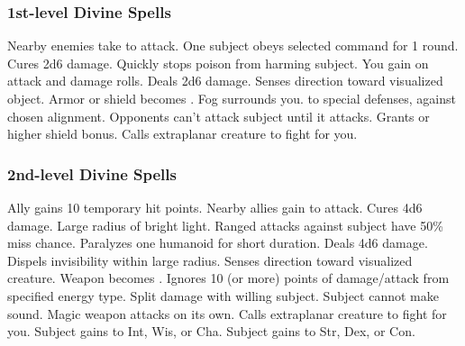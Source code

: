 \subsubsection{1st-level Divine Spells}
\begin{spelllist}
   Nearby enemies take  to attack.
   One subject obeys selected command for 1 round.
   Cures 2d6 damage.
   Quickly stops poison from harming subject.
   You gain  on attack and damage rolls.
   Deals 2d6 damage.
   Senses direction toward visualized object.
   Armor or shield becomes .
   Fog surrounds you.
    to special defenses,  against chosen alignment.
   Opponents can't attack subject until it attacks.
   Grants  or higher shield bonus.
   Calls extraplanar creature to fight for you.
\end{spelllist}

\subsubsection{2nd-level Divine Spells}
\begin{spelllist}
   Ally gains 10 temporary hit points.
   Nearby allies gain  to attack.
   Cures 4d6 damage.
   Large radius of bright light.
   Ranged attacks against subject have 50\% miss chance.
   Paralyzes one humanoid for short duration.
   Deals 4d6 damage.
   Dispels invisibility within large radius.
   Senses direction toward visualized creature.
   Weapon becomes .
   Ignores 10 (or more) points of damage/attack from specified energy type.
    Split damage with willing subject.
   Subject cannot make sound.
   Magic weapon attacks on its own.
   Calls extraplanar creature to fight for you.
   Subject gains  to Int, Wis, or Cha.
   Subject gains  to Str, Dex, or Con.
\end{spelllist}

